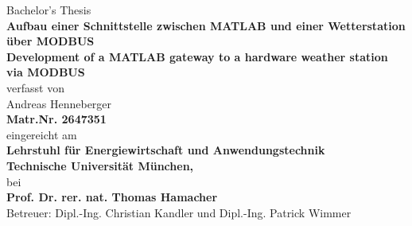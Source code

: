 \begin{titlepage}
\begin{center}
\LARGE{Bachelor's Thesis}\vspace{0.5cm}\\
\LARGE{\textbf{Aufbau einer Schnittstelle zwischen MATLAB und einer Wetterstation über MODBUS\\ Development of a MATLAB gateway to a hardware weather station via MODBUS}}\vspace{0.5cm}\\
verfasst von\vspace{0.5cm}\\
Andreas Henneberger\\
\textbf{Matr.Nr. 2647351}\vspace{0.5cm}\\
eingereicht am\vspace{0.25cm}\\
\LARGE{\textbf{Lehrstuhl für Energiewirtschaft und Anwendungstechnik\\Technische Universität München,}}\vspace{0.25cm}\\
bei\vspace{0.25cm}\\
\textbf{Prof. Dr. rer. nat. Thomas Hamacher}\vspace{0.5cm}\\
Betreuer: Dipl.-Ing. Christian Kandler und Dipl.-Ing. Patrick Wimmer
\end{center}



\end{titlepage}
